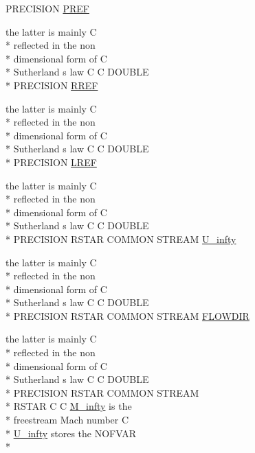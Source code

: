 \begin{DoxyCompactItemize}
P\-R\-E\-C\-I\-S\-I\-O\-N \hyperlink{stream_8com_ac527abdf107d6bddcbc6a80631e1ab59}{P\-R\-E\-F}
\item 
the latter is mainly C \\*
reflected in the non \\*
dimensional form of C \\*
Sutherland s law C C D\-O\-U\-B\-L\-E \\*
P\-R\-E\-C\-I\-S\-I\-O\-N \hyperlink{stream_8com_a79112f231fb3da56eef3fc61c1e77bbd}{R\-R\-E\-F}
\item 
the latter is mainly C \\*
reflected in the non \\*
dimensional form of C \\*
Sutherland s law C C D\-O\-U\-B\-L\-E \\*
P\-R\-E\-C\-I\-S\-I\-O\-N \hyperlink{stream_8com_a19d492a15feda819ed49e580c6a1568f}{L\-R\-E\-F}
\item 
the latter is mainly C \\*
reflected in the non \\*
dimensional form of C \\*
Sutherland s law C C D\-O\-U\-B\-L\-E \\*
P\-R\-E\-C\-I\-S\-I\-O\-N R\-S\-T\-A\-R C\-O\-M\-M\-O\-N S\-T\-R\-E\-A\-M \hyperlink{stream_8com_a396c12357ce60c0aaccd169e136b5d9a}{U\-\_\-infty}
\item 
the latter is mainly C \\*
reflected in the non \\*
dimensional form of C \\*
Sutherland s law C C D\-O\-U\-B\-L\-E \\*
P\-R\-E\-C\-I\-S\-I\-O\-N R\-S\-T\-A\-R C\-O\-M\-M\-O\-N S\-T\-R\-E\-A\-M \hyperlink{stream_8com_af5929b7a58c2e64c3b9908fd35bc0e5a}{F\-L\-O\-W\-D\-I\-R}
\item 
the latter is mainly C \\*
reflected in the non \\*
dimensional form of C \\*
Sutherland s law C C D\-O\-U\-B\-L\-E \\*
P\-R\-E\-C\-I\-S\-I\-O\-N R\-S\-T\-A\-R C\-O\-M\-M\-O\-N S\-T\-R\-E\-A\-M \\*
R\-S\-T\-A\-R C C \hyperlink{stream_8com_a57c765efd76d44669f6966962bda2d72}{M\-\_\-infty} is the \\*
freestream Mach number C \\*
\hyperlink{stream_8com_a3306f725a42d6173548f0867aa4313ef}{U\-\_\-infty} stores the N\-O\-F\-V\-A\-R \\*

\end{DoxyCompactItemize}
